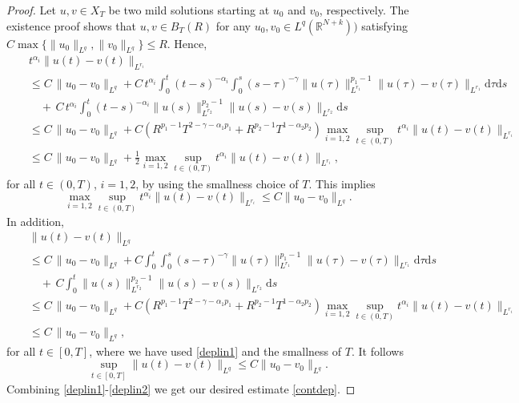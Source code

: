 \documentclass[a4,psfig,english,12pt,epsf,portrait]{article}
\numberwithin{equation}{section}
\def\R{{\mathbb {R}}}
\def\R{\mathbb{R}}
\begin{document}
\begin{proof}
	 	Let $u,v\in X_T$ be two mild solutions starting at $u_0$ and $v_0$, respectively. The existence proof shows that $u,v\in B_T(R)$ for any $u_0,v_0\in L^q(\R^{N+k}))$ satisfying $C\max\{\|u_0\|_{L^q},\|v_0\|_{L^q}\}\leq R$. Hence,
	\begin{eqnarray*}
		&& t^{\alpha_i}\|u(t)-v(t)\|_{L^{r_i}} \\
		&& \leq  C\,\|u_0-v_0\|_{L^q} + C\,t^{\alpha_i}\int_0^t(t-s)^{-\alpha_i} \int_0^s (s-\tau)^{-\gamma} \|u(\tau)\|_{L^{r_1}}^{p_1-1}\|u(\tau) - v(\tau) \|_{L^{r_1}} \mathrm{d}\tau \mathrm{d}s \nonumber \\
		&{}&\quad +\, 
		C\,t^{\alpha_i}\int_0^t(t-s)^{-\alpha_i} \|u(s)\|_{L^{r_2}}^{p_2-1}\|u(s) - v(s) \|_{L^{r_2}} \mathrm{d}s  \nonumber\\
		&&\leq  C\,\|u_0-v_0\|_{L^q} + C\left( R^{p_1-1}T^{2-\gamma-\alpha_1 p_1} + R^{p_2-1}T^{1-\alpha_2 p_2} \right) \max_{i=1,2} \sup_{t \in (0,T)}t^{\alpha_i}\|u(t)-v(t)\|_{L^{r_i}}\nonumber\\
		&&\leq  C\,\|u_0-v_0\|_{L^q} + \frac{1}{2}\max_{i=1,2} \sup_{t \in (0,T)}t^{\alpha_i}\|u(t)-v(t)\|_{L^{r_i}},
	\end{eqnarray*}
	for all $t\in(0,T)$, $i=1,2$, by using the smallness choice of $T$. This implies
	\begin{equation}\label{deplin1}
		\max_{i=1,2} \sup_{t \in (0,T)}t^{\alpha_i}\|u(t)-v(t)\|_{L^{r_i}} \leq C\|u_0-v_0\|_{L^q}.
	\end{equation}
	In addition,
	\begin{eqnarray*}
		&&\|u(t)-v(t)\|_{L^q} \\
		&&\leq  C\,\|u_0-v_0\|_{L^q} + C\int_0^t \int_0^s (s-\tau)^{-\gamma} \|u(\tau)\|_{L^{r_1}}^{p_1-1}\|u(\tau) - v(\tau) \|_{L^{r_1}} \mathrm{d}\tau \mathrm{d}s  \\
		&{}&\quad + \,C\int_0^t \|u(s)\|_{L^{r_2}}^{p_2-1}\|u(s) - v(s) \|_{L^{r_2}} \mathrm{d}s  \\
		&&\leq C\,\|u_0-v_0\|_{L^q} + C\left( R^{p_1-1}T^{2-\gamma-\alpha_1 p_1} + R^{p_2-1}T^{1-\alpha_2 p_2} \right) \max_{i=1,2} \sup_{t \in (0,T)}t^{\alpha_i}\|u(t)-v(t)\|_{L^{r_i}}\nonumber\\
		&&\leq  C\,\|u_0-v_0\|_{L^q} ,
	\end{eqnarray*}
	for all $t\in[0,T]$, where we have used \eqref{deplin1} and the smallness of $T$. It follows
	\begin{equation}\label{deplin2}
		\sup_{t \in [0,T]} \|u(t)-v(t)\|_{L^q} \leq C\|u_0 - v_0\|_{L^q} .
	\end{equation}
	Combining \eqref{deplin1}-\eqref{deplin2} we get our desired estimate \eqref{contdep}.
\end{proof}
\end{document}
